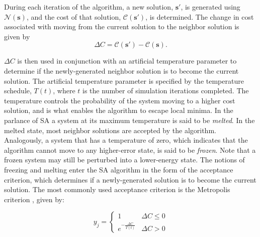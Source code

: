\documentclass[11pt]{afthesis}
\begin{document}
	\noindent During each iteration of the algorithm, a new solution, \begin{math}\boldsymbol{s}'  \end{math}, is generated using \begin{math}\boldsymbol{\mathcal{N}(\boldsymbol{s})} \end{math}, and the cost of that solution, \begin{math}\mathcal{C}(\boldsymbol{s}' ) \end{math}, is determined. The change in cost associated with moving from the current solution to the neighbor solution is given by 
	\begin{equation*} \label{eq:delta_cost}
	\Delta C =  \mathcal{C}(\boldsymbol{s}')-\mathcal{C}(\boldsymbol{s}).
	\end{equation*}
	
	\begin{math}\Delta C \end{math} is then used in conjunction with an artificial temperature parameter to determine if the newly-generated neighbor solution is to become the current solution. The artificial temperature parameter is specified by the temperature schedule, \begin{math}T(t)\end{math}, where \begin{math}t\end{math} is the number of simulation iterations completed. The temperature controls the probability of the system moving to a higher cost solution, and is what enables the algorithm to escape local minima. In the parlance of SA \cite{kirkpatrick1983} a system at its maximum temperature is said to be \textit{melted}. In the melted state, most neighbor solutions are accepted by the algorithm. Analogously, a system that has a temperature of zero, which indicates that the algorithm cannot move to any higher-error state, is said to be \textit{frozen}. Note that a frozen system may still be perturbed into a lower-energy state. The notions of freezing and melting enter the SA algorithm in the form of the acceptance criterion, which determines if a newly-generated solution is to become the current solution. The most commonly used acceptance criterion is the Metropolis criterion \cite{metropolis1953}, given by:
	
	\begin{equation} 
	y_j = \begin{cases}
	1 &\Delta C   \leq 0 \\
	e^{-\frac{\Delta C}{T(t)}} & \Delta C > 0 
	\end{cases}
	\end{equation}
\end{document}
